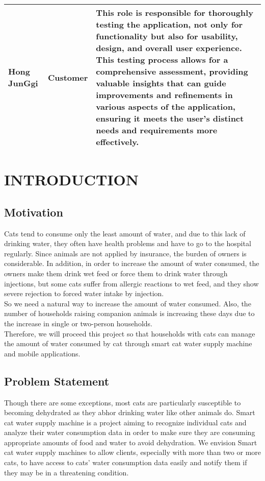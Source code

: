 \documentclass[conference]{IEEEtran}
\begin{document}
\newpage
\begin{table}[htbp!]\normalsize
\begin{center}
\begin{tabular}{|p{1.2cm}|p{1.9cm}|p{4.5cm}|}
\hline
Hong JunGgi & Customer &
This role is responsible for thoroughly testing the application, not only for functionality but also for usability, design, and overall user experience. This testing process allows for a comprehensive assessment, providing valuable insights that can guide improvements and refinements in various aspects of the application, ensuring it meets the user's distinct needs and requirements more effectively.
\\ \hline
\end{tabular}
\label{tab3}
\end{center}
\end{table}

\section{INTRODUCTION}
\subsection{Motivation}
Cats tend to consume only the least amount of water, and due to this lack of drinking water, they often have health problems and have to go to the hospital regularly. Since animals are not applied by insurance, the burden of owners is considerable. In addition, in order to increase the amount of water consumed, the owners make them drink wet feed or force them to drink water through injections, but some cats suffer from allergic reactions to wet feed, and they show severe rejection to forced water intake by injection. \\
So we need a natural way to increase the amount of water consumed. Also, the number of households raising companion animals is increasing these days due to the increase in single or two-person households. \\

Therefore, we will proceed this project so that households with cats can manage the amount of water consumed by cat through smart cat water supply machine and mobile applications. \\

\subsection{Problem Statement}
Though there are some exceptions, most cats are particularly susceptible to becoming dehydrated as they abhor drinking water like other animals do. Smart cat water supply machine is a project aiming to recognize individual cats and analyze their water consumption data in order to make sure they are consuming appropriate amounts of food and water to avoid dehydration. We envision Smart cat water supply machines to allow clients, especially with more than two or more cats, to have access to cats' water consumption data easily and notify them if they may be in a threatening condition. \\
\end{document}
